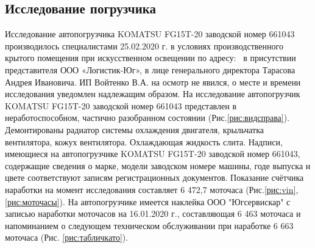 

\subsection{Исследование погрузчика}
%
Исследование автопогрузчика KOMATSU FG15T-20 заводской номер 661043 производилось специалистами 25.02.2020 г. в условиях производственного крытого помещения при искусственном освещении по адресу: \, в присутствии представителя ООО «Логистик-Юг», в лице генерального  директора Тарасова Андрея Ивановича. ИП Войтенко В.А. на осмотр не явился,  о месте и времени исследования уведомлен надлежащим образом.  На исследование автопогрузчик KOMATSU FG15T-20 заводской номер 661043 представлен в неработоспособном, частично разобранном состоянии (Рис.\ref{рис:видсправа}). Демонтированы радиатор системы охлаждения двигателя, крыльчатка вентилятора, кожух вентилятора.  Охлаждающая жидкость слита. Надписи, имеющиеся на автопогрузчике KOMATSU FG15T-20 заводской номер 661043, содержащие сведения о марке, модели заводском номере машины, годе  выпуска и цвете соответствуют записям регистрационных документов. Показание счётчика наработки на момент исследования составляет 6 472,7 моточаса (Рис.\ref{рис:vin},  \ref{рис:моточасы}). На автопогрузчике  имеется наклейка ООО "Югсервискар" с записью наработки моточасов на  16.01.2020 г., составляющая 6 463 моточаса и напоминанием о следующем техническом обслуживании при наработке 6 663 моточаса (Рис. \ref{рис:табличкато}).

